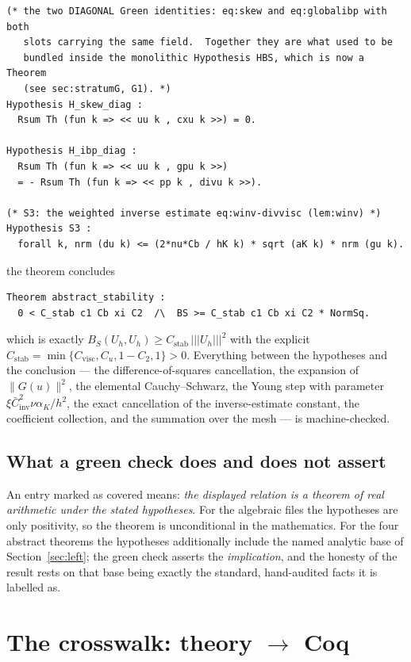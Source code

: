 \documentclass[11pt]{article}
\newcommand{\aK}{\alpha_K}
\newcommand{\Cstab}{C_{\mathrm{stab}}}
\begin{document}
\begin{lstlisting}
(* the two DIAGONAL Green identities: eq:skew and eq:globalibp with both
   slots carrying the same field.  Together they are what used to be
   bundled inside the monolithic Hypothesis HBS, which is now a Theorem
   (see sec:stratumG, G1). *)
Hypothesis H_skew_diag :
  Rsum Th (fun k => << uu k , cxu k >>) = 0.

Hypothesis H_ibp_diag :
  Rsum Th (fun k => << uu k , gpu k >>)
  = - Rsum Th (fun k => << pp k , divu k >>).

(* S3: the weighted inverse estimate eq:winv-divvisc (lem:winv) *)
Hypothesis S3 :
  forall k, nrm (du k) <= (2*nu*Cb / hK k) * sqrt (aK k) * nrm (gu k).
\end{lstlisting}

\noindent
the theorem concludes
\begin{lstlisting}
Theorem abstract_stability :
  0 < C_stab c1 Cb xi C2  /\  BS >= C_stab c1 Cb xi C2 * NormSq.
\end{lstlisting}

\noindent
which is exactly $B_S(U_h,U_h)\ge \Cstab\,|||U_h|||^2$ with the explicit
$\Cstab=\min\{C_{\mathrm{visc}},C_u,1-C_2,1\}>0$. Everything between the
hypotheses and the conclusion --- the difference-of-squares cancellation, the
expansion of $\lVert G(u)\rVert^2$, the elemental Cauchy--Schwarz, the Young
step with parameter $\xi\bar C_{\mathrm{inv}}^2\nu\aK/h^2$, the exact
cancellation of the inverse-estimate constant, the coefficient collection, and
the summation over the mesh --- is machine-checked.

\subsection{What a green check does and does not assert}

An entry marked as covered means: \emph{the displayed relation is a theorem of
real arithmetic under the stated hypotheses}. For the algebraic files the
hypotheses are only positivity, so the theorem is unconditional in the
mathematics. For the four abstract theorems the hypotheses additionally include
the named analytic base of Section~\ref{sec:left}; the green check asserts the
\emph{implication}, and the honesty of the result rests on that base being
exactly the standard, hand-audited facts it is labelled as.

\section{The crosswalk: theory \texorpdfstring{$\to$}{->} Coq}\label{sec:crosswalk}
\end{document}
